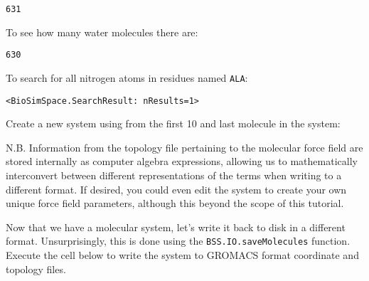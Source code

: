 \begin{verbatim}
631
\end{verbatim}

To see how many water molecules there are:

\begin{Shaded}
\begin{Highlighting}[]
\end{Highlighting}
\end{Shaded}

\begin{verbatim}
630
\end{verbatim}

To search for all nitrogen atoms in residues named \texttt{ALA}:

\begin{Shaded}
\begin{Highlighting}[]
\NormalTok{)}
\end{Highlighting}
\end{Shaded}

\begin{verbatim}
<BioSimSpace.SearchResult: nResults=1>
\end{verbatim}

Create a new system using from the first 10 and last molecule in the
system:

\begin{Shaded}
\begin{Highlighting}[]
\OperatorTok{=}\NormalTok{ (system[:}\NormalTok{] }\OperatorTok{+}\NormalTok{ system[}\OperatorTok{-}\NormalTok{]).toSystem()}
\end{Highlighting}
\end{Shaded}

N.B. Information from the topology file pertaining to the molecular
force field are stored internally as computer algebra expressions,
allowing us to mathematically interconvert between different
representations of the terms when writing to a different format. If
desired, you could even edit the system to create your own unique force
field parameters, although this beyond the scope of this tutorial.

Now that we have a molecular system, let's write it back to disk in a
different format. Unsurprisingly, this is done using the
\texttt{BSS.IO.saveMolecules} function. Execute the cell below to write
the system to GROMACS format coordinate and topology files.

